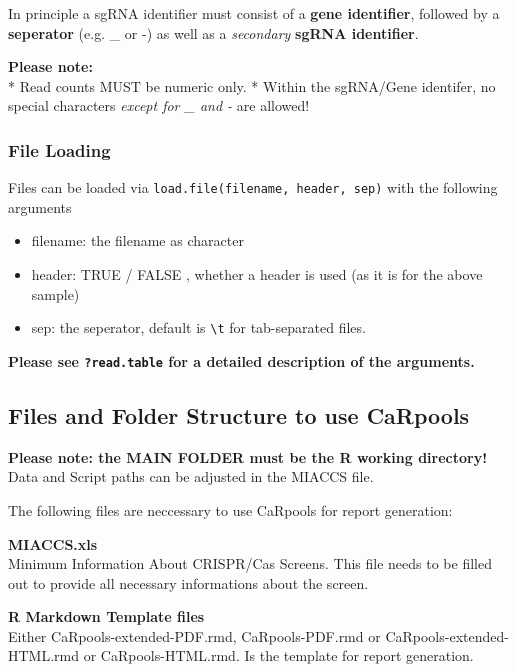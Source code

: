 \documentclass[]{article}
\providecommand{\tightlist}{%
  \setlength{\itemsep}{0pt}\setlength{\parskip}{0pt}}
\begin{document}
In principle a sgRNA identifier must consist of a \textbf{gene
identifier}, followed by a \textbf{seperator} (e.g. \_ or -) as well as
a \emph{secondary} \textbf{sgRNA identifier}.

\textbf{Please note:}\\
* Read counts MUST be numeric only. * Within the sgRNA/Gene identifer,
no special characters \emph{except for \_ and -} are allowed!

\subsubsection{File Loading}\label{file-loading}

Files can be loaded via \texttt{load.file(filename,\ header,\ sep)} with
the following arguments

\begin{itemize}
\tightlist
\item
  filename: the filename as character
\item
  header: TRUE / FALSE , whether a header is used (as it is for the
  above sample)
\item
  sep: the seperator, default is \texttt{\textbackslash{}t} for
  tab-separated files.
\end{itemize}

\textbf{Please see \texttt{?read.table} for a detailed description of
the arguments.}

\subsection{Files and Folder Structure to use
CaRpools}\label{files-and-folder-structure-to-use-carpools}

\textbf{Please note: the MAIN FOLDER must be the R working directory!}\\
Data and Script paths can be adjusted in the MIACCS file.

The following files are neccessary to use CaRpools for report
generation:

\textbf{MIACCS.xls}\\
Minimum Information About CRISPR/Cas Screens. This file needs to be
filled out to provide all necessary informations about the screen.

\textbf{R Markdown Template files}\\
Either CaRpools-extended-PDF.rmd, CaRpools-PDF.rmd or
CaRpools-extended-HTML.rmd or CaRpools-HTML.rmd. Is the template for
report generation.
\end{document}
